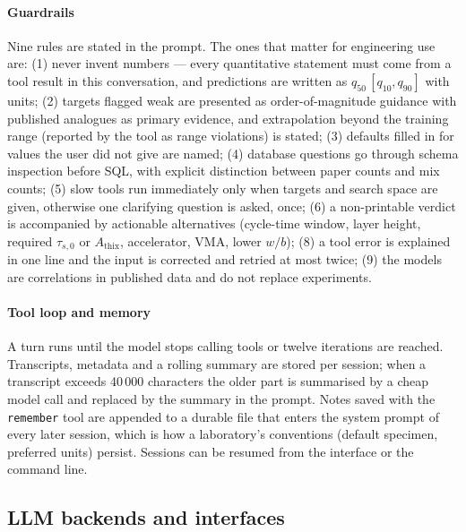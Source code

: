 \documentclass[preprint,12pt]{elsarticle}
\begin{document}
\paragraph{Guardrails} Nine rules are stated in the prompt. The ones that matter for engineering use are: (1) never invent numbers --- every quantitative statement must come from a tool result in this conversation, and predictions are written as $q_{50}\,[q_{10}, q_{90}]$ with units; (2) targets flagged weak are presented as order-of-magnitude guidance with published analogues as primary evidence, and extrapolation beyond the training range (reported by the tool as range violations) is stated; (3) defaults filled in for values the user did not give are named; (4) database questions go through schema inspection before SQL, with explicit distinction between paper counts and mix counts; (5) slow tools run immediately only when targets and search space are given, otherwise one clarifying question is asked, once; (6) a non-printable verdict is accompanied by actionable alternatives (cycle-time window, layer height, required $\tau_{s,0}$ or $A_{\mathrm{thix}}$, accelerator, VMA, lower $w/b$); (8) a tool error is explained in one line and the input is corrected and retried at most twice; (9) the models are correlations in published data and do not replace experiments.

\paragraph{Tool loop and memory} A turn runs until the model stops calling tools or twelve iterations are reached. Transcripts, metadata and a rolling summary are stored per session; when a transcript exceeds 40\,000 characters the older part is summarised by a cheap model call and replaced by the summary in the prompt. Notes saved with the \texttt{remember} tool are appended to a durable file that enters the system prompt of every later session, which is how a laboratory's conventions (default specimen, preferred units) persist. Sessions can be resumed from the interface or the command line.

\subsection{LLM backends and interfaces}
\end{document}

